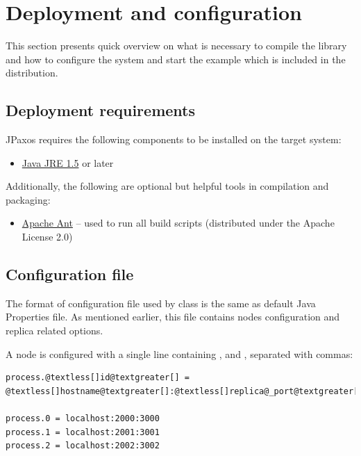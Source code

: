 \section{Deployment and configuration}
\label{config:deployment-and-configuration}\label{config::doc}
This section presents quick overview on what is necessary to compile the
library and how to configure the system and start the example which is included
in the distribution.


\subsection{Deployment requirements}
\label{config:deployment-requirements}
JPaxos requires the following components to be installed on the target system:
\begin{itemize}
\item {} 
\href{http://www.java.com/}{Java JRE 1.5} or later

\end{itemize}

Additionally, the following are optional but helpful tools in compilation and
packaging:
\begin{itemize}
\item {} 
\href{http://ant.apache.org/}{Apache Ant} -- used to run all build scripts (distributed under the Apache
License 2.0)

\end{itemize}


\subsection{Configuration file}
\label{config:configuration-file}
The format of configuration file used by  class is the same as
default Java Properties file. As mentioned earlier, this file contains
nodes configuration and replica related options.


\label{config:node-configuration}
A node is configured with a single line containing ,  and , separated with commas:

\begin{Verbatim}[commandchars=@\[\]]
process.@textless[]id@textgreater[] = @textless[]hostname@textgreater[]:@textless[]replica@_port@textgreater[]:@textless[]client@_port@textgreater[]

process.0 = localhost:2000:3000
process.1 = localhost:2001:3001
process.2 = localhost:2002:3002
\end{Verbatim}

